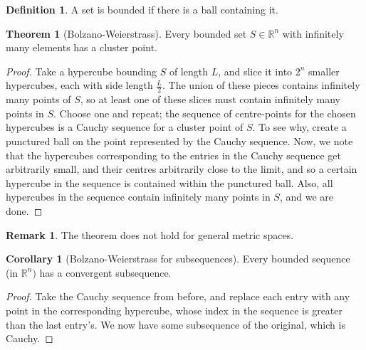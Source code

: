 \documentclass{article}
\theoremstyle{definition}
\newtheorem{thm}{Theorem}[subsubsection]
\newtheorem{defn}{Definition}[subsubsection]
\newtheorem{rmk}{Remark}[subsubsection]
\newtheorem{cor}{Corollary}[subsubsection]
\begin{document}
\begin{defn}
	A set is bounded if there is a ball containing it.
\end{defn}
\begin{thm}[Bolzano-Weierstrass]
	Every bounded set $S\in\mathbb{R}^n$ with infinitely many elements has a cluster point.
\end{thm}
\begin{proof}
	Take a hypercube bounding $S$ of length $L$, and slice it into $2^n$ smaller hypercubes, each with side length $\frac{L}{2}$. The union of these pieces contains infinitely many points of $S$, so at least one of these slices must contain infinitely many points in $S$. Choose one and repeat; the sequence of centre-points for the chosen hypercubes is a Cauchy sequence for a cluster point of $S$. To see why, create a punctured ball on the point represented by the Cauchy sequence. Now, we note that the hypercubes corresponding to the entries in the Cauchy sequence get arbitrarily small, and their centres arbitrarily close to the limit, and so a certain hypercube in the sequence is contained within the punctured ball. Also, all hypercubes in the sequence contain infinitely many points in $S$, and we are done.
\end{proof}
\begin{rmk}
	The theorem does not hold for general metric spaces.
\end{rmk}
\begin{cor}[Bolzano-Weierstrass for subsequences]
	Every bounded sequence (in $\mathbb{R}^n)$ has a convergent subsequence.
\end{cor}
\begin{proof}
	Take the Cauchy sequence from before, and replace each entry with any point in the corresponding hypercube, whose index in the sequence is greater than the last entry's. We now have some subsequence of the original, which is Cauchy.
\end{proof}

\newpage
\end{document}
